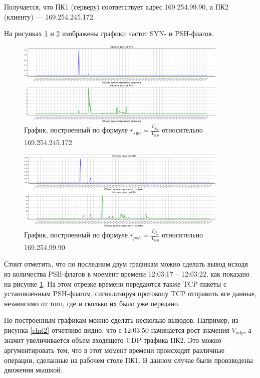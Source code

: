 \documentclass[bachelor, och, coursework]{SCWorks}
\begin{document}
  Получается, что ПК1 (серверу) соответствует адрес 169.254.99.90, а ПК2 (клиенту) --- 169.254.245.172.

  На рисунках \ref{clnt4} и \ref{serv4} изображены графики частот SYN- и PSH-флагов.

  \begin{figure}[H]
    \centering
    \includegraphics[width=0.9\textwidth]{photo/clnt4.png}
    \caption{График, построенный по формуле $r_{syn} = \frac{V_{S_{in}}}{V_{tcp}}$ относительно 169.254.245.172}
    \label{clnt4}
  \end{figure}

  \begin{figure}[H]
    \centering
    \includegraphics[width=0.9\textwidth]{photo/serv4.png}
    \caption{График, построенный по формуле $r_{psh} = \frac{V_{P_{in}}}{V_{tcp}}$ относительно 169.254.99.90}
    \label{serv4}
  \end{figure}

  Стоит отметить, что по последним двум графикам можно сделать вывод исходя из количества PSH-флагов в моемент времени 12:03:17 --
  12:03:22, как показано на рисунке \ref{clnt4}. На этом отрезке времени передаются также TCP-пакеты с установленным PSH-флагом,
  сигнализируя протоколу TCP отправить все данные, независимо от того, где и сколько их было уже передано.

  По построенным графикам можно сделать несколько выводов.
  Например, из рисунка \ref{clnt2} отчетливо видно, что с 12:03:50 начинается рост значения $V_{udp}$, а значит
  увеличивается объем входящего UDP-трафика ПК2. Это можно аргументировать тем, что в этот момент времени происходят
  различные операции, сделанные на рабочем столе ПК1. В данном случае были произведены движения мышкой.
\end{document}
